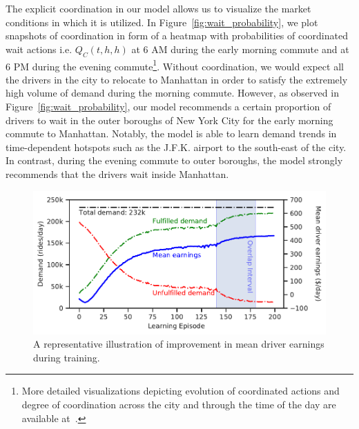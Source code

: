The explicit coordination in our model 
    allows us to visualize the market conditions in which it is utilized.
In Figure~\ref{fig:wait_probability}, we plot snapshots of
    coordination in form of a heatmap with probabilities of 
    coordinated wait actions i.e. $Q_C(t, h, h)$ at 6 AM during the early 
    morning commute and at 6 PM during the evening commute\footnote{More
    detailed visualizations depicting evolution of coordinated actions and degree of
    coordination across the city and through the time of the day are available 
    at~\cite{github-page}.}.
Without coordination, we would expect all the drivers in the city to relocate
    to Manhattan in order to satisfy the extremely high volume of demand during
    the morning commute. 
However, as observed in Figure~\ref{fig:wait_probability},
    our model recommends a certain proportion of drivers to wait in the outer
    boroughs of New York City for the early morning commute to Manhattan.
Notably, the model is able to learn demand trends in time-dependent hotspots
    such as the J.F.K. airport to the south-east of the city.
In contrast, during the evening commute to outer boroughs, the model 
    strongly recommends
    that the drivers wait inside Manhattan.

\begin{figure}
	\centering
    \includegraphics[scale=0.5]{figures/rl_training.pdf}
	\caption{A representative illustration of improvement in mean driver 
    earnings during training.} 
	\label{fig:rl_training}
\end{figure}

